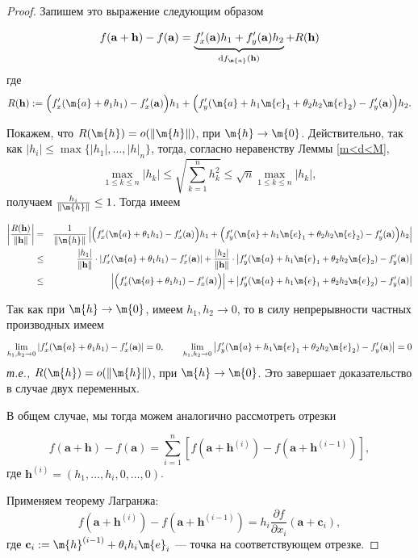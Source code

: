 \begin{proof}
Запишем это выражение следующим образом

\[
    f(\mathbf{a} + \mathbf{h}) - f(\mathbf{a}) = \underbrace{f'_x(\mathbf{a})h_1 + f'_y(\mathbf{a})h_2}_{\mathrm{d}f_\m{a}(\mathbf{h})} + R(\mathbf{h})
    \]
где
  \[
  R(\mathbf{h}) := \Bigl(f_x'(\m{a}+ \theta_1 h_1) - f_x'(\mathbf{a})\Bigr)h_1 + \Bigl(f_y'(\m{a} + h_1\m{e}_1 + \theta_2 h_2 \m{e}_2) - f'_y(\mathbf{a})\Bigr)h_2.
 \]

Покажем, что $R(\m{h}) = o(\|\m{h}\|)$, при $\m{h} \to \m{0}$. Действительно, так как $|h_i| \le \max \{ |h_1|,\ldots, |h|_n \}$, тогда, согласно неравенству Леммы \ref{m<d<M},
\[
\max_{1 \le k \le n} |h_k| \le \sqrt{\sum_{k=1}^n h_k^2} \le \sqrt{n} \max_{1\le k \le n} |h_k|,
\]
получаем $\frac{h_i}{\|\m{h}\|} \le 1$. Тогда имеем

\begin{eqnarray*}
  \left| \frac{R(\mathbf{h})}{\|\mathbf{h}\|} \right| &=& \frac{1}{\|\m{h}\|} \left| \Bigl(f_x'(\m{a}+ \theta_1 h_1) - f_x'(\mathbf{a})\Bigr)h_1 + \Bigl(f_y'(\m{a} + h_1\m{e}_1 + \theta_2 h_2 \m{e}_2) - f'_y(\mathbf{a})\Bigr)h_2 \right| \\
  &\leq& \frac{|h_1|}{\|\mathbf{h}\|}  \cdot \left|f_x'(\m{a}+ \theta_1 h_1) - f_x'(\mathbf{a}) \right|  + \frac{|h_2|}{\|\mathbf{h}\|}  \cdot \left|f_y'(\m{a} + h_1\m{e}_1 + \theta_2 h_2 \m{e}_2) - f'_y(\mathbf{a}) \right|  \\
  &\le & \left| \Bigl(f_x'(\m{a}+ \theta_1 h_1) - f_x'(\mathbf{a})\Bigr) \right|  +  \left|f_y'(\m{a} + h_1\m{e}_1 + \theta_2 h_2 \m{e}_2) - f'_y(\mathbf{a}) \right|
\end{eqnarray*}

Так как при $\m{h} \to \m{0}$, имеем $h_1,h_2 \to 0$, то в силу непрерывности частных производных имеем
\[
 \lim_{h_1,h_2 \to 0} \left|  f_x'(\m{a}+ \theta_1 h_1) - f_x'(\mathbf{a}) \right| =0,  \qquad \lim_{h_1,h_2 \to 0} \left|f_y'(\m{a} + h_1\m{e}_1 + \theta_2 h_2 \m{e}_2) - f'_y(\mathbf{a}) \right| = 0
\]
\textit{т.е.,} $R(\m{h}) = o(\|\m{h}\|)$, при $\m{h} \to \m{0}$. Это завершает доказательство в случае двух переменных.

В общем случае, мы тогда можем аналогично рассмотреть отрезки 


\[
    f(\mathbf{a} + \mathbf{h}) - f(\mathbf{a}) = \sum_{i=1}^n \left[ f(\mathbf{a} + \mathbf{h}^{(i)}) - f(\mathbf{a} + \mathbf{h}^{(i-1)}) \right],
    \]
    где \( \mathbf{h}^{(i)} = (h_1, \dots, h_i, 0, \dots, 0) \).

    \item Применяем теорему Лагранжа:
    \[
    f(\mathbf{a} + \mathbf{h}^{(i)}) - f(\mathbf{a} + \mathbf{h}^{(i-1)}) = h_i \frac{\partial f}{\partial x_i}(\mathbf{a} + \mathbf{c}_i),
    \]
    где \( \mathbf{c}_i: = \m{h}^{(i-1)} + \theta_ih_i \m{e}_i \) — точка на соответствующем отрезке.


\end{proof}
